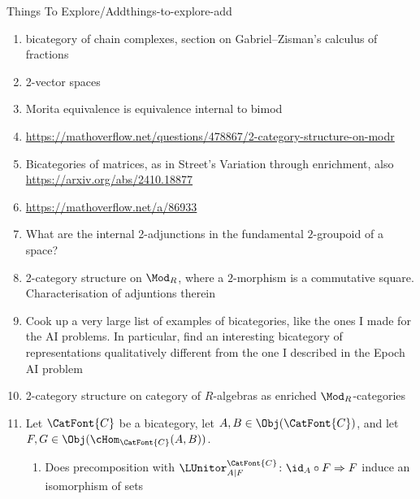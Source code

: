 \begin{remark}{Things To Explore/Add}{things-to-explore-add}
\begin{enumerate}
\begin{enumerate}
                \item Given a bicategory $\CatFont{C}$, there should be a category $\FontForCategories{K}_{0}(\CatFont{C})$ with $\Hom_{\FontForCategories{K}_{0}(\CatFont{C})}(A,B)\defeq\K_{0}(\cHom_{\CatFont{C}}(A,B))$
                \item The set $\K^{\rmeq}_{0}(\CatFont{C})$ of equivalence classes of objects of $\CatFont{C}$ should then satisfy
                    \[
                        \K^{\rmeq}_{0}(\CatFont{C})%
                        \cong%
                        \K_{0}(\FontForCategories{K}_{0}(\CatFont{C})).
                    \]%
            \end{enumerate}
        \item bicategory of chain complexes, section  on Gabriel--Zisman's calculus of fractions
        \item 2-vector spaces
        \item Morita equivalence is equivalence internal to bimod
        \item \url{https://mathoverflow.net/questions/478867/2-category-structure-on-modr}
        \item Bicategories of matrices, as in Street's Variation through enrichment, also \url{https://arxiv.org/abs/2410.18877}
        \item \url{https://mathoverflow.net/a/86933}
        \item What are the internal 2-adjunctions in the fundamental $2$-groupoid of a space?
        \item 2-category structure on $\Mod_{R}$, where a $2$-morphism is a commutative square. Characterisation of adjuntions therein
        \item Cook up a very large list of examples of bicategories, like the ones I made for the AI problems. In particular, find an interesting bicategory of representations qualitatively different from the one I described in the Epoch AI problem
        \item 2-category structure on category of $R$-algebras as enriched $\Mod_{R}$-categories
        \item Let $\CatFont{C}$ be a bicategory, let $A,B\in\Obj(\CatFont{C})$, and let $F,G\in\Obj(\cHom_{\CatFont{C}}(A,B))$.
            \begin{enumerate}
                \item Does precomposition with $\LUnitor^{\CatFont{C}}_{A|F}\colon\id_{A}\circ F\Rightarrow F$ induce an isomorphism of sets

\end{enumerate}
\end{enumerate}
\end{remark}
